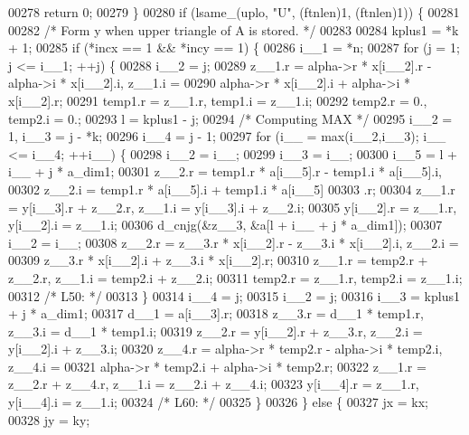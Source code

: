 \begin{DoxyCode}
00278     \textcolor{keywordflow}{return} 0;
00279     \}
00280     \textcolor{keywordflow}{if} (lsame\_(uplo, \textcolor{stringliteral}{"U"}, (ftnlen)1, (ftnlen)1)) \{
00281 
00282 \textcolor{comment}{/*        Form  y  when upper triangle of A is stored. */}
00283 
00284     kplus1 = *k + 1;
00285     \textcolor{keywordflow}{if} (*incx == 1 && *incy == 1) \{
00286         i\_\_1 = *n;
00287         \textcolor{keywordflow}{for} (j = 1; j <= i\_\_1; ++j) \{
00288         i\_\_2 = j;
00289         z\_\_1.r = alpha->r * x[i\_\_2].r - alpha->i * x[i\_\_2].i, z\_\_1.i =
00290              alpha->r * x[i\_\_2].i + alpha->i * x[i\_\_2].r;
00291         temp1.r = z\_\_1.r, temp1.i = z\_\_1.i;
00292         temp2.r = 0., temp2.i = 0.;
00293         l = kplus1 - j;
00294 \textcolor{comment}{/* Computing MAX */}
00295         i\_\_2 = 1, i\_\_3 = j - *k;
00296         i\_\_4 = j - 1;
00297         \textcolor{keywordflow}{for} (i\_\_ = max(i\_\_2,i\_\_3); i\_\_ <= i\_\_4; ++i\_\_) \{
00298             i\_\_2 = i\_\_;
00299             i\_\_3 = i\_\_;
00300             i\_\_5 = l + i\_\_ + j * a\_dim1;
00301             z\_\_2.r = temp1.r * a[i\_\_5].r - temp1.i * a[i\_\_5].i, 
00302                 z\_\_2.i = temp1.r * a[i\_\_5].i + temp1.i * a[i\_\_5]
00303                 .r;
00304             z\_\_1.r = y[i\_\_3].r + z\_\_2.r, z\_\_1.i = y[i\_\_3].i + z\_\_2.i;
00305             y[i\_\_2].r = z\_\_1.r, y[i\_\_2].i = z\_\_1.i;
00306             d\_cnjg(&z\_\_3, &a[l + i\_\_ + j * a\_dim1]);
00307             i\_\_2 = i\_\_;
00308             z\_\_2.r = z\_\_3.r * x[i\_\_2].r - z\_\_3.i * x[i\_\_2].i, z\_\_2.i =
00309                  z\_\_3.r * x[i\_\_2].i + z\_\_3.i * x[i\_\_2].r;
00310             z\_\_1.r = temp2.r + z\_\_2.r, z\_\_1.i = temp2.i + z\_\_2.i;
00311             temp2.r = z\_\_1.r, temp2.i = z\_\_1.i;
00312 \textcolor{comment}{/* L50: */}
00313         \}
00314         i\_\_4 = j;
00315         i\_\_2 = j;
00316         i\_\_3 = kplus1 + j * a\_dim1;
00317         d\_\_1 = a[i\_\_3].r;
00318         z\_\_3.r = d\_\_1 * temp1.r, z\_\_3.i = d\_\_1 * temp1.i;
00319         z\_\_2.r = y[i\_\_2].r + z\_\_3.r, z\_\_2.i = y[i\_\_2].i + z\_\_3.i;
00320         z\_\_4.r = alpha->r * temp2.r - alpha->i * temp2.i, z\_\_4.i = 
00321             alpha->r * temp2.i + alpha->i * temp2.r;
00322         z\_\_1.r = z\_\_2.r + z\_\_4.r, z\_\_1.i = z\_\_2.i + z\_\_4.i;
00323         y[i\_\_4].r = z\_\_1.r, y[i\_\_4].i = z\_\_1.i;
00324 \textcolor{comment}{/* L60: */}
00325         \}
00326     \} \textcolor{keywordflow}{else} \{
00327         jx = kx;
00328         jy = ky;

\end{DoxyCode}
